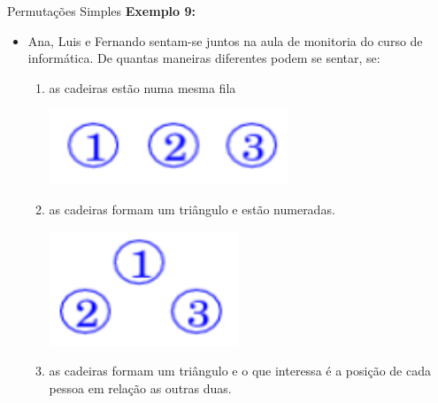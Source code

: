 \documentclass[aspectratio=169]{beamer}
\begin{document}
\begin{frame}{Permutações Simples}
    \textbf{Exemplo 9:}

    \vspace{2mm}

    \begin{itemize}
        \item[] Ana, Luis e Fernando sentam-se juntos na aula de monitoria do curso de informática. De quantas maneiras diferentes podem se sentar, se:
        \begin{enumerate}[(1)]
            \item as cadeiras estão numa mesma fila
            \begin{center}
                \includegraphics[width=0.2\linewidth]{figs/Exemplo9_1.png}
            \end{center}
            \item as cadeiras formam um triângulo e estão numeradas.
            \begin{center}
                \includegraphics[width=0.1\linewidth]{figs/Exemplo9_2.png}
            \end{center}
            \item as cadeiras formam um triângulo e o que interessa é a posição de cada pessoa em relação as outras duas.
        \end{enumerate}
    \end{itemize}
\end{frame}
\end{document}
